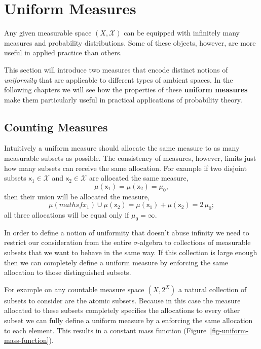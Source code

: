 \documentclass[
  letterpaper,
  DIV=11,
  numbers=noendperiod]{scrartcl}
\begin{document}
\hypertarget{uniform-measures}{%
\section{Uniform Measures}\label{uniform-measures}}

Any given measurable space \((X, \mathcal{X})\) can be equipped with
infinitely many measures and probability distributions. Some of these
objects, however, are more useful in applied practice than others.

This section will introduce two measures that encode distinct notions of
\emph{uniformity} that are applicable to different types of ambient
spaces. In the following chapters we will see how the properties of
these \textbf{uniform measures} make them particularly useful in
practical applications of probability theory.

\hypertarget{counting-measures}{%
\subsection{Counting Measures}\label{counting-measures}}

Intuitively a uniform measure should allocate the same measure to as
many measurable subsets as possible. The consistency of measures,
however, limits just how many subsets can receive the same allocation.
For example if two disjoint subsets \(\mathsf{x}_{1} \in \mathcal{X}\)
and \(\mathsf{x}_{2} \in \mathcal{X}\) are allocated the same measure,
\[
\mu(\mathsf{x}_{1}) = \mu(\mathsf{x}_{2}) = \mu_{0},
\] then their union will be allocated the measure, \[
\mu(mathsf{x}_{1}) \cup \mu(\mathsf{x}_{2})
=
\mu(\mathsf{x}_{1}) + \mu(\mathsf{x}_{2})
=
2 \, \mu_{0};
\] all three allocations will be equal only if \(\mu_{0} = \infty\).

In order to define a notion of uniformity that doesn't abuse infinity we
need to restrict our consideration from the entire \(\sigma\)-algebra to
collections of measurable subsets that we want to behave in the same
way. If this collection is large enough then we can completely define a
uniform measure by enforcing the same allocation to those distinguished
subsets.

For example on any countable measure space \((X, 2^{X})\) a natural
collection of subsets to consider are the atomic subsets. Because in
this case the measure allocated to these subsets completely specifies
the allocations to every other subset we can fully define a uniform
measure by a enforcing the same allocation to each element. This results
in a constant mass function (Figure~\ref{fig-uniform-mass-function}).
\end{document}
